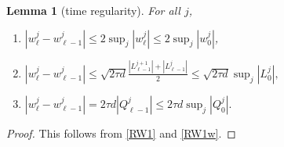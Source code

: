 \documentclass[a4paper,11pt]{article}
\def\l{{h}}
\def\Lip{{\mathrm{Lip}}}
\newtheorem{lemma}{Lemma}[section]
\theoremstyle{remark}
\begin{document}
\begin{lemma}[time regularity] \label{uniform_est_time}
 For all $j$, 
 \begin{enumerate}
  \item $\left|w^j_\ell - w^j_{\ell-1}\right| \le 2\displaystyle \sup _{j} |w^j_\ell| \le 2\displaystyle \sup _{j} |w^j_0|$, 
  \item $\left|w^j_\ell - w^j_{\ell-1}\right| \le \sqrt{2\tau d}\displaystyle \frac{|L^{j+1}_{\ell-1}| + |L^{j}_{\ell-1}|}{2}\le \sqrt{2\tau d}\displaystyle\sup _{j} |L^j_{0}|,$
  \item $\left|w^j_\ell - w^j_{\ell-1}\right| = 2\tau d |Q^j_{\ell-1}| \le 2\tau d\displaystyle\sup _{j} |Q^j_{0}|.$
 \end{enumerate}
\end{lemma}
\begin{proof}
This follows from \eqref{RW1} and \eqref{RW1w}. %
\end{proof}
\end{document}
